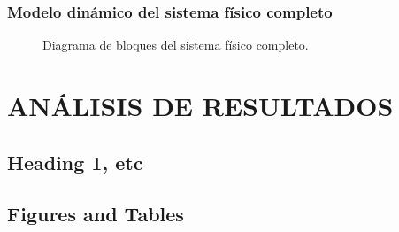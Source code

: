 \documentclass[a4paper, 10pt, journal]{ieeeconf}
\begin{document}
\subsubsection{\textbf{Modelo dinámico del sistema físico completo}}
\begin{figure}[thpb]
    \centering
    \begin{adjustbox}{max width=\columnwidth}
    \end{adjustbox}
    \caption{Diagrama de bloques del sistema físico completo.}
    \label{diagrama de bloques del sistema físico}
\end{figure}






























\section{ANÁLISIS DE RESULTADOS}


\subsection{Heading 1, etc}


\subsection{Figures and Tables}
\end{document}

